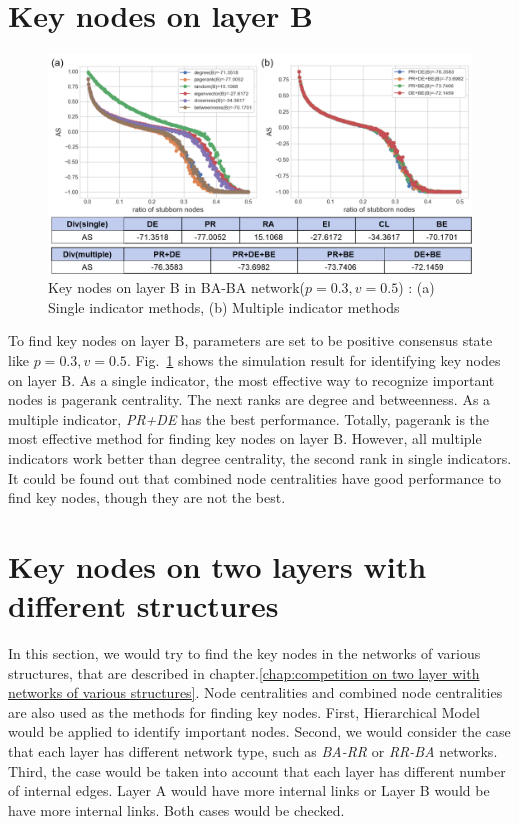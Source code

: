 \section{Key nodes on layer B}
\begin{figure}[!htb]
	\centering
	\includegraphics[width=\hsize]{figure/chap5_keynode_B.png}
	\caption{Key nodes on layer B in BA-BA network($p=0.3, v=0.5$) : (a) Single indicator methods, (b) Multiple indicator methods}
	\label{chap5_keynode_B}
\end{figure}

To find key nodes on layer B, parameters are set to be positive consensus state like $p=0.3, v=0.5$. Fig.~\ref{chap5_keynode_B} shows the simulation result for identifying key nodes on layer B. As a single indicator, the most effective way to recognize important nodes is pagerank centrality. The next ranks are degree and betweenness. As a multiple indicator, \textit{PR+DE} has the best performance. Totally, pagerank is the most effective method for finding key nodes on layer B. However, all multiple indicators work better than degree centrality, the second rank in single indicators. It could be found out that combined node centralities have good performance to find key nodes, though they are not the best. 

\section{Key nodes on two layers with different structures}
In this section, we would try to find the key nodes in the networks of various structures, that are described in chapter.\ref{chap:competition on two layer with networks of various structures}. Node centralities and combined node centralities are also used as the methods for finding key nodes. First, Hierarchical Model would be applied to identify important nodes. Second, we would consider the case that each layer has different network type, such as \textit{BA-RR} or \textit{RR-BA} networks. Third, the case would be taken into account that each layer has different number of internal edges. Layer A would have more internal links or Layer B would be have more internal links. Both cases would be checked. 

